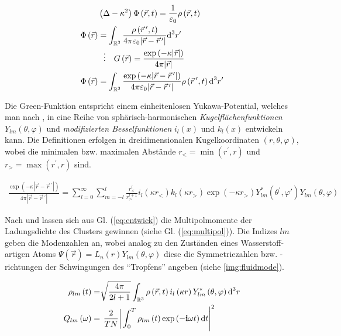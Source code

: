 \documentclass[numbers=noenddot,a4paper]{scrartcl}
\newcommand{\diff}{\textnormal{d}}
\newcommand{\ix}[1]{_\text{#1}}
\newcommand{\imag}{\mathbf{i}}
\newcommand{\tilt}[1]{\textit{#1}}
\begin{document}
						\begin{align}
							&\left(\Delta-\kappa^2\right)\Phi\left(\vec{r},t\right)=\frac{1}{\varepsilon\ix{0}}\rho\left(\vec{r},t\right) \label{eq:poisson} \\
							\Phi\left(\vec{r}\right)&=\int_{\mathbb{R}^3}\frac{\rho\left(\vec{r}\,^\prime,t\right)}{4\pi\varepsilon\ix{0}|\vec{r}-\vec{r}\,^\prime|}\diff^{3}r^\prime \\
							&\,\,\,\,\vdots\quad G\left(\vec{r}\right)=\frac{\exp\left(-\kappa|\vec{r}|\right)}{4\pi|\vec{r}|} \label{eq:green}\\
							\Phi\left(\vec{r}\right)&=\int_{\mathbb{R}^3}\frac{\exp\left(-\kappa|\vec{r}-\vec{r}\,^\prime|\right)}{4\pi\varepsilon\ix{0}|\vec{r}-\vec{r}\,^\prime|}\rho\left(\vec{r}\,^\prime,t\right)\diff^{3}r^\prime \label{eq:fluid}
						\end{align}

					Die Green-Funktion entspricht einem einheitenlosen Yukawa-Potential, welches man nach \cite{Arfken05},\cite{Yap10} in eine Reihe von sphärisch-harmonischen \tilt{Kugelflächenfunktionen} $Y_{lm}\left(\theta,\varphi\right)$ und \tilt{modifizierten Besselfunktionen} $i_{l}\left(x\right)$ und $k_{l}\left(x\right)$ entwickeln kann. Die Definitionen erfolgen in dreidimensionalen Kugelkoordinaten $\left(r,\theta,\varphi\right)$, wobei die minimalen bzw. maximalen Abstände $r\ix{<}=\min\left(r^\prime,r\right)$ und $r\ix{>}=\max\left(r^\prime,r\right)$ sind.

						\begin{align}
							\frac{\exp\left(-\kappa|\vec{r}-\vec{r}\,^\prime|\right)}{4\pi|\vec{r}-\vec{r}\,^\prime|}=\sum_{l=0}^{\infty}\sum_{m=-l}^{l}\frac{r\ix{<}^l}{r\ix{>}^{l+1}}i_{l}\left(\kappa r\ix{<}\right)k_{l}\left(\kappa r\ix{>}\right)\exp\left(-\kappa r\ix{>}\right)Y_{lm}^*\left(\theta^\prime,\varphi\prime\right)Y_{lm}\left(\theta,\varphi\right) \label{eq:entwick}
						\end{align}

					Nach \cite{Ivanov09} und \cite{Schella13} lassen sich aus Gl. (\ref{eq:entwick}) die Multipolmomente der Ladungsdichte des Clusters gewinnen (siehe Gl. (\ref{eq:multipol})). Die Indizes $lm$ geben die Modenzahlen an, wobei analog zu den Zust\"anden eines Wasserstoff-artigen Atoms $\Psi\left(\vec{r}\right)=L_{n}\left(r\right)Y_{lm}\left(\theta,\varphi\right)$ diese die Symmetriezahlen bzw. -richtungen der Schwingungen des "`Tropfens"' angeben (siehe \ref{img:fluidmode}).

						\begin{align}
							\rho_{lm}\left(t\right)=&\sqrt{\frac{4\pi}{2l+1}}\int_{\mathbb{R}^{3}}\rho\left(\vec{r},t\right)i_{l}\left(\kappa r\right)Y^{*}_{lm}\left(\theta,\varphi\right)\diff^{3}r \label{eq:multipol} \\
							Q_{lm}\left(\omega\right)=&\left.\left.\frac{2}{TN}\right|\int_{0}^{T}\rho_{lm}\left(t\right)\exp\left(-\imag\omega t\right)\diff t\right|^{2}
						\end{align}
\end{document}
